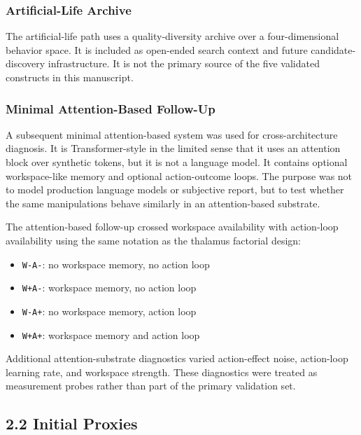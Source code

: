 \documentclass[
  11pt,
  letterpaper,
]{article}
\providecommand{\tightlist}{%
  \setlength{\itemsep}{0pt}\setlength{\parskip}{0pt}}
\begin{document}
\subsubsection{Artificial-Life Archive}\label{artificial-life-archive}

The artificial-life path uses a quality-diversity archive over a
four-dimensional behavior space. It is included as open-ended search
context and future candidate-discovery infrastructure. It is not the
primary source of the five validated constructs in this manuscript.

\subsubsection{Minimal Attention-Based
Follow-Up}\label{minimal-attention-based-follow-up}

A subsequent minimal attention-based system was used for
cross-architecture diagnosis. It is Transformer-style in the limited
sense that it uses an attention block over synthetic tokens, but it is
not a language model. It contains optional workspace-like memory and
optional action-outcome loops. The purpose was not to model production
language models or subjective report, but to test whether the same
manipulations behave similarly in an attention-based substrate.

The attention-based follow-up crossed workspace availability with
action-loop availability using the same notation as the thalamus
factorial design:

\begin{itemize}
\tightlist
\item
  \texttt{W-A-}: no workspace memory, no action loop
\item
  \texttt{W+A-}: workspace memory, no action loop
\item
  \texttt{W-A+}: no workspace memory, action loop
\item
  \texttt{W+A+}: workspace memory and action loop
\end{itemize}

Additional attention-substrate diagnostics varied action-effect noise,
action-loop learning rate, and workspace strength. These diagnostics
were treated as measurement probes rather than part of the primary
validation set.

\subsection{2.2 Initial Proxies}\label{initial-proxies}
\end{document}
